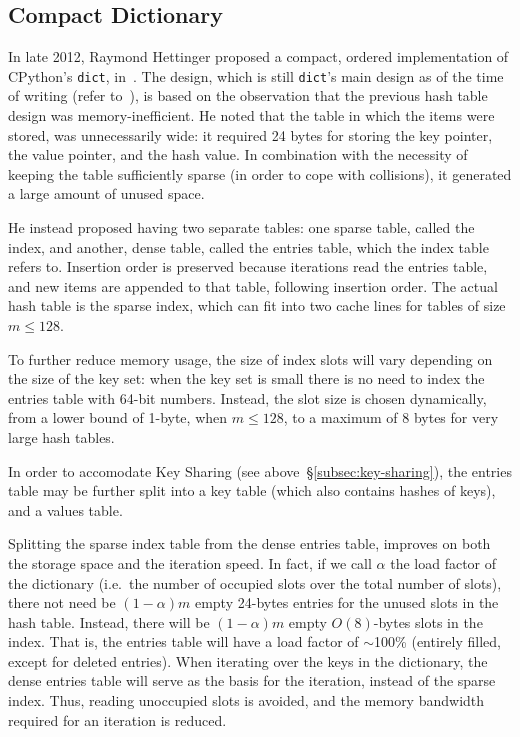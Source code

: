 \subsection{Compact Dictionary}\label{subsec:compact-dict}

In late 2012, Raymond Hettinger proposed a compact, ordered implementation of CPython's \texttt{dict}, in~\cite{hettinger-dict}.
The design, which is still \texttt{dict}'s main design as of the time of writing (refer to~\cite{dict-comment-design}), is based on the observation that the previous hash table design was memory-inefficient.
He noted that the table in which the items were stored, was unnecessarily wide: it required 24 bytes for storing the key pointer, the value pointer, and the hash value.
In combination with the necessity of keeping the table sufficiently sparse (in order to cope with collisions), it generated a large amount of unused space.

He instead proposed having two separate tables: one sparse table, called the index, and another, dense table, called the entries table, which the index table refers to.
Insertion order is preserved because iterations read the entries table, and new items are appended to that table, following insertion order.
The actual hash table is the sparse index, which can fit into two cache lines for tables of size $m \leq 128$.

To further reduce memory usage, the size of index slots will vary depending on the size of the key set: when the key set is small there is no need to index the entries table with 64-bit numbers.
Instead, the slot size is chosen dynamically, from a lower bound of 1-byte, when $m \leq 128$, to a maximum of 8 bytes for very large hash tables.

In order to accomodate Key Sharing (see above~\S\ref{subsec:key-sharing}), the entries table may be further split into a key table (which also contains hashes of keys), and a values table.

Splitting the sparse index table from the dense entries table, improves on both the storage space and the iteration speed.
In fact, if we call $\alpha$ the load factor of the dictionary (i.e.\ the number of occupied slots over the total number of slots), there not need be $(1 - \alpha)m$ empty 24-bytes entries for the unused slots in the hash table.
Instead, there will be $(1 - \alpha)m$ empty $O(8)$-bytes slots in the index.
That is, the entries table will have a load factor of $\sim$100\% (entirely filled, except for deleted entries).
When iterating over the keys in the dictionary, the dense entries table will serve as the basis for the iteration, instead of the sparse index.
Thus, reading unoccupied slots is avoided, and the memory bandwidth required for an iteration is reduced.

